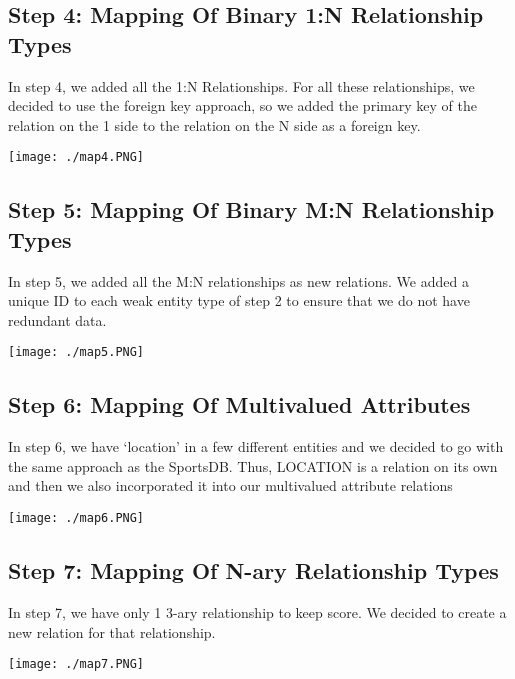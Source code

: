\documentclass[titlepage]{article}
\begin{document}
\subsection{Step 4: Mapping Of Binary 1:N Relationship Types}
\vspace{1em}
\noindent
In step 4, we added all the 1:N Relationships. For all these relationships, we decided to use
the foreign key approach, so we added the primary key of the relation on the 1 side
to the relation on the N side as a foreign key.
\vspace{1em}
\begin{center}
\texttt{[image: ./map4.PNG]}
\end{center}
\newpage


\subsection{Step 5: Mapping Of Binary M:N Relationship Types}
\vspace{1em}
\noindent
In step 5, we added all the M:N relationships as new relations. We added a unique ID to each
weak entity type of step 2 to ensure that we do not have redundant data.
\vspace{1em}
\begin{center}
\texttt{[image: ./map5.PNG]}
\end{center}
\newpage


\subsection{Step 6: Mapping Of Multivalued Attributes}
\vspace{1em}
\noindent
In step 6, we have ‘location’ in a few different entities and we decided to go with the same
approach as the SportsDB. Thus, LOCATION is a relation on its own and then we
also incorporated it into our multivalued attribute relations
\vspace{1em}
\begin{center}
\texttt{[image: ./map6.PNG]}
\end{center}
\newpage



\subsection{Step 7: Mapping Of N-ary Relationship Types}
\vspace{1em}
\noindent
In step 7, we have only 1 3-ary relationship to keep score. We decided to create a new
relation for that relationship.
\vspace{1em}
\begin{center}
\texttt{[image: ./map7.PNG]}
\end{center}
\newpage
\end{document}

